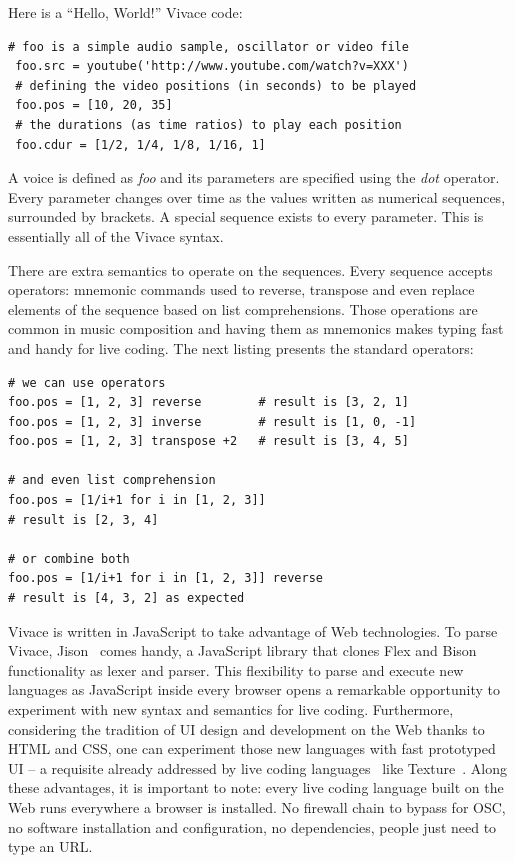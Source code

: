 \documentclass[letterpaper, 12pt]{article}
\begin{document}
Here is a ``Hello, World!'' Vivace code:

\begin{Verbatim}[fontfamily=courier, xleftmargin=\parindent]
 # foo is a simple audio sample, oscillator or video file
 foo.src = youtube('http://www.youtube.com/watch?v=XXX')
 # defining the video positions (in seconds) to be played
 foo.pos = [10, 20, 35]
 # the durations (as time ratios) to play each position
 foo.cdur = [1/2, 1/4, 1/8, 1/16, 1]
\end{Verbatim}

A voice is defined as \textit{foo} and its parameters are specified
using the \textit{dot} operator. Every parameter changes over time as
the values written as numerical sequences, surrounded by brackets. A
special sequence exists to every parameter. This is essentially all of the
Vivace syntax.

There are extra semantics to operate on the sequences. Every sequence
accepts operators: mnemonic commands used to reverse, transpose and
even replace elements of the sequence based on list
comprehensions. Those operations are common in music composition and
having them as mnemonics makes typing fast and handy for live
coding. The next listing presents the standard operators:

\begin{Verbatim}[fontfamily=courier, xleftmargin=\parindent]
# we can use operators
foo.pos = [1, 2, 3] reverse        # result is [3, 2, 1]
foo.pos = [1, 2, 3] inverse        # result is [1, 0, -1]
foo.pos = [1, 2, 3] transpose +2   # result is [3, 4, 5]

# and even list comprehension
foo.pos = [1/i+1 for i in [1, 2, 3]] 
# result is [2, 3, 4]

# or combine both
foo.pos = [1/i+1 for i in [1, 2, 3]] reverse 
# result is [4, 3, 2] as expected
\end{Verbatim}

Vivace is written in JavaScript to take advantage of Web technologies.
To parse Vivace, Jison~\citep*{jison} comes handy, a JavaScript
library that clones Flex and Bison functionality as lexer and
parser. This flexibility to parse and execute new languages as
JavaScript inside every browser opens a remarkable opportunity to
experiment with new syntax and semantics for live
coding. Furthermore, considering the tradition of UI design and
development on the Web thanks to HTML and CSS, one can experiment those
new languages with fast prototyped UI -- a requisite already addressed
by live coding languages~\citep*{magnusson2011algorithms} like
Texture~\citep*{mclean2011texture}. Along these advantages, it is
important to note: every live coding language built on the Web runs
everywhere a browser is installed. No firewall chain to bypass for
OSC, no software installation and configuration, no dependencies,
people just need to type an URL.
\end{document}
